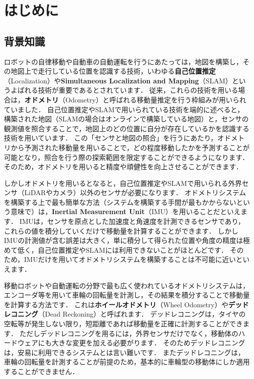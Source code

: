 \section{はじめに}

\subsection{背景知識}

ロボットの自律移動や自動車の自動運転を行うにあたっては，地図を構築し，その地図上で走行している位置を認識する技術，いわゆる{\bf 自己位置推定}（Localization）や{\bf Simultaneous Localization and Mapping}（SLAM）というよばれる技術が重要であるとされています．
従来，これらの技術を用いる場合は，{\bf オドメトリ}（Odometry）と呼ばれる移動量推定を行う枠組みが用いられていました．
自己位置推定やSLAMで用いられている技術を端的に述べると，構築された地図（SLAMの場合はオンラインで構築している地図）と，センサの観測値を照合することで，地図上のどの位置に自分が存在しているかを認識する技術を用いています．
この「センサと地図の照合」を行うにあたり，オドメトリから予測された移動量を用いることで，どの程度移動したかを予測することが可能となり，照合を行う際の探索範囲を限定することができるようになります．
そのため，オドメトリを用いると精度や頑健性を向上させることができます．

しかしオドメトリを用いるとなると，自己位置推定やSLAMで用いられる外界センサ（LiDARやカメラ）以外のセンサが必要になります．
オドメトリシステムを構築する上で最も簡単な方法（システムを構築する手間が最もかからないという意味で）は，{\bf Inertial Measurement Unit}（IMU）を用いることだといえます．
IMUは，センサを原点とした加速度と角速度を計測できるセンサであり，これらの値を積分していくだけで移動量を計算することができます．
しかしIMUの計測値が含む誤差は大きく，単に積分して得られた位置や角度の精度は極めて低く，自己位置推定やSLAMには利用できないことがほとんどです．
そのため，IMUだけを用いてオドメトリシステムを構築することは不可能に近いといえます．

移動ロボットや自動運転の分野で最も広く使われているオドメトリシステムは，エンコーダ等を用いて車輪の回転量を計測し，その結果を積分することで移動量を計算する方法です．
これは{\bf ホイールオドメトリ}（Wheel Odometry）や{\bf デッドレコニング}（Dead Reckoning）と呼ばれます．
デッドレコニングは，タイヤの空転等が発生しない限り，短距離であれば移動量を正確に計測することができます．
ただしデッドレコニングを用るには，外界センサだけでなく，移動体のハードウェアにも大きな変更を加える必要がります．
そのためデッドレコニングは，安易に利用できるシステムとは言い難いです．
またデッドレコニングは，車輪の回転量を計測することが前提のため，基本的に車輪型の移動体にしか適用することができません．

